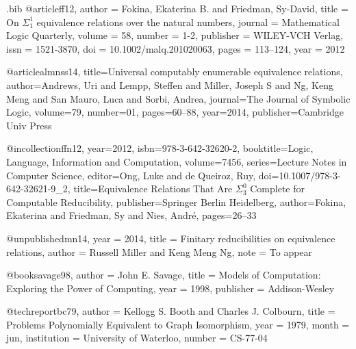 \begin{filecontents*}{\jobname.bib}
@article{ff12,
author = {Fokina, Ekaterina B. and Friedman, Sy-David},
title = {On $\Sigma^1_1$ equivalence relations over the natural numbers},
journal = {Mathematical Logic Quarterly},
volume = 58,
number = {1-2},
publisher = {WILEY-VCH Verlag},
issn = {1521-3870},
doi = {10.1002/malq.201020063},
pages = {113--124},
year = 2012
}

@article{almnss14,
  title={Universal computably enumerable equivalence relations},
  author={Andrews, Uri and Lempp, Steffen and Miller, Joseph S and Ng, Keng Meng and San Mauro, Luca and Sorbi, Andrea},
  journal={The Journal of Symbolic Logic},
  volume=79,
  number=01,
  pages={60--88},
  year=2014,
  publisher={Cambridge Univ Press}
}

@incollection{ffn12,
year=2012,
isbn={978-3-642-32620-2},
booktitle={Logic, Language, Information and Computation},
volume=7456,
series={Lecture Notes in Computer Science},
editor={Ong, Luke and de Queiroz, Ruy},
doi={10.1007/978-3-642-32621-9_2},
title={Equivalence Relations That Are $\Sigma^0_3$ Complete for Computable Reducibility},
publisher={Springer Berlin Heidelberg},
author={Fokina, Ekaterina and Friedman, Sy and Nies, André},
pages={26--33}
}

@unpublished{mn14,
  year = 2014,
  title = {Finitary reducibilities on equivalence relations},
  author = {Russell Miller and Keng Meng Ng},
  note = {To appear}
}

@book{savage98,
  author = {John E. Savage},
  title = {Models of Computation: Exploring the Power of Computing},
  year = {1998},
  publisher = {Addison-Wesley}
}

@techreport{bc79,
  author = {Kellogg S. Booth and Charles J. Colbourn},
  title = {Problems Polynomially Equivalent to Graph Isomorphism},
  year = 1979,
  month = jun,
  institution = {University of Waterloo},
  number = {CS-77-04}
}
\end{filecontents*}
